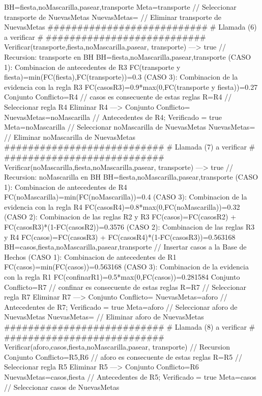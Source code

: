 \begin{listing}[language=Pascal]
	BH={fiesta,noMascarilla,pasear,transporte}
	Meta=transporte // Seleccionar transporte de NuevasMetas
	NuevasMetas={} // Eliminar transporte de NuevasMetas
  ###########################
  # Llamada (6) a verificar #
  ###########################
	Verificar(transporte,{fiesta,noMascarilla,pasear,
	transporte}) ---> true // Recursion: transporte en BH
	BH={fiesta,noMascarilla,pasear,transporte}
	(CASO 1): Combinacion de antecedentes de R3
	 FC(transporte y fiesta)=min(FC(fiesta),FC(transporte))=0.3
	(CASO 3): Combinacion de la evidencia con la regla R3
	 FC(casos{R3})=0.9*max(0,FC(transporte y fiesta))=0.27
	Conjunto Conflicto={R4} // casos es consecuente de estas reglas
	R={R4} // Seleccionar regla R4
	Eliminar R4 ---> Conjunto Conflicto={}
	NuevasMetas={noMascarilla} // Antecedentes de R4; Verificado = true
	Meta=noMascarilla // Seleccionar noMascarilla de NuevasMetas
	NuevasMetas={} // Eliminar noMascarilla de NuevasMetas
  ###########################
  # Llamada (7) a verificar #
  ###########################
	Verificar(noMascarilla,{fiesta,noMascarilla,pasear,
	transporte}) ---> true // Recursion: noMascarilla en BH
	BH={fiesta,noMascarilla,pasear,transporte}
	(CASO 1): Combinacion de antecedentes de R4
	 FC(noMascarilla)=min(FC(noMascarilla))=0.4
	(CASO 3): Combinacion de la evidencia con la regla R4
	 FC(casos{R4})=0.8*max(0,FC(noMascarilla))=0.32
	(CASO 2): Combinacion de las reglas R2 y R3
	 FC(casos)=FC(casos{R2}) + FC(casos{R3})*(1-FC(casos{R2}))=0.3576
	(CASO 2): Combinacion de las reglas R3 y R4
	 FC(casos)=FC(casos{R3}) + FC(casos{R4})*(1-FC(casos{R3}))=0.563168
	BH={casos,fiesta,noMascarilla,pasear,transporte} // Insertar casos a la Base de Hechos
	(CASO 1): Combinacion de antecedentes de R1
	 FC(casos)=min(FC(casos))=0.563168
	(CASO 3): Combinacion de la evidencia con la regla R1
	 FC(confinar{R1})=0.5*max(0,FC(casos))=0.281584
	Conjunto Conflicto={R7} // confinar es consecuente de estas reglas
	R={R7} // Seleccionar regla R7
	Eliminar R7 ---> Conjunto Conflicto={}
	NuevasMetas={aforo} // Antecedentes de R7; Verificado = true
	Meta=aforo // Seleccionar aforo de NuevasMetas
	NuevasMetas={} // Eliminar aforo de NuevasMetas
  ###########################
  # Llamada (8) a verificar #
  ###########################
	Verificar(aforo,{casos,fiesta,noMascarilla,pasear,
	transporte}) // Recursion 
	Conjunto Conflicto={R5,R6} // aforo es consecuente de estas reglas
	R={R5} // Seleccionar regla R5
	Eliminar R5 ---> Conjunto Conflicto={R6}
	NuevasMetas={casos,fiesta} // Antecedentes de R5; Verificado = true
	Meta=casos // Seleccionar casos de NuevasMetas

\end{listing}
